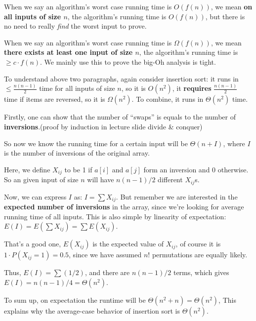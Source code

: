 \begin{spacing}{1.3}
    When we say an algorithm’s worst case running time is $O(f(n))$,
    we mean {\bf on all inputs of size $n$}, the algorithm’s 
    running time is $O(f(n))$, but there is no need to really 
    {\it find} the worst input to prove.

    When we say an algorithm’s worst case running time is $\Omega(f(n))$,
    we mean {\bf there exists at least one input of size $n$}, the algorithm’s 
    running time is $\ge c\cdot f(n)$. We mainly use this to prove 
    the big-Oh analysis is tight.

    To understand above two paragraphs, again consider insertion
    sort: it runs in $\le \frac{n(n-1)}{2}$ time for all inputs 
    of size $n$, so it is $O(n^2)$, it {\bf requires} 
    $\frac{n(n-1)}{2}$ time if items are reversed, 
    so it is $\Omega(n^2)$. To combine, it runs in $\Theta(n^2)$ time.



    \newpage

    Firstly, one can show that the number of ``swaps'' 
    is equals to the number of {\bf inversions}.(proof by induction in 
    lecture slide divide \& conquer)

    So now we know the running time for a certain input
    will be $\Theta(n+I)$, 
    where $I$ is the number of inversions of the original array.

    Here, we define $X_{ij}$ to be 1 if $a[i]$ and $a[j]$ form 
    an inversion and 0 otherwise. So an given input of size $n$
    will have $n(n-1)/2$ different $X_{ij}$s.

    Now, we can express $I$ as: $I=\sum X_{ij}$. But 
    remember we are interested in the {\bf expected number 
    of inversions} in the array, since we're looking for average 
    running time of all inputs. This is also simple by 
    linearity of expectation: $E(I)=E(\sum X_{ij})=\sum E(X_{ij})$.

    That's a good one, $E(X_{ij})$ is the expected value
    of $X_{ij}$, of course it is $1\cdot P(X_{ij}=1)=0.5$, 
    since we have assumed $n!$ permutations are equally likely.

    Thus, $E(I)=\sum (1/2)$, and there are $n(n-1)/2$ terms,
    which gives $E(I)=n(n-1)/4=\Theta(n^2)$.

    To sum up, on expectation the runtime will be
    $\Theta(n^2+n)=\Theta(n^2)$, This explains why the average-case 
    behavior of insertion sort is $\Theta(n^2)$.
\end{spacing}
